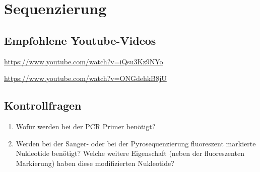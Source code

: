 \section{Sequenzierung}





\subsection{Empfohlene Youtube-Videos}
\begin{description}[align=left]
    \item [PCR] \href{https://www.youtube.com/watch?v=iQsu3Kz9NYo}{https://www.youtube.com/watch?v=iQsu3Kz9NYo}
    \item [Sanger-Sequenzierung] \href{https://www.youtube.com/watch?v=ONGdehkB8jU}{https://www.youtube.com/watch?v=ONGdehkB8jU}
\end{description}

\subsection{Kontrollfragen} 
\begin{enumerate}
	\item Wofür werden bei der PCR Primer benötigt?
	\item Werden bei der Sanger- oder bei der Pyrosequenzierung fluoreszent markierte Nukleotide benötigt? Welche weitere Eigenschaft (neben der fluoreszenten Markierung) haben diese modifizierten Nukleotide?
\end{enumerate}
